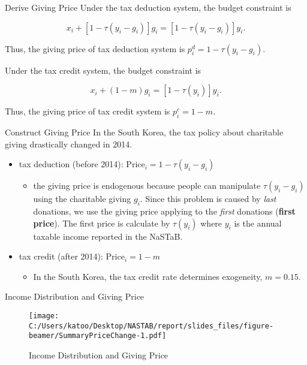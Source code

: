 \documentclass[
  ignorenonframetext,
]{beamer}
\providecommand{\tightlist}{%
  \setlength{\itemsep}{0pt}\setlength{\parskip}{0pt}}
\begin{document}
\begin{frame}{Derive Giving Price}
\protect\hypertarget{derive-giving-price}{}
Under the tax deduction system, the budget constraint is

\[
    x_i + [1 - \tau(y_i - g_i)]g_i = [1 - \tau(y_i - g_i)] y_i.
\]

Thus, the giving price of tax deduction system is
\(p_i^{d} = 1 - \tau(y_i - g_i)\).

Under the tax credit system, the budget constraint is

\[
    x_i + (1 - m) g_i = [1 - \tau(y_i)] y_i.
\]

Thus, the giving price of tax credit system is \(p_i^c = 1 - m\).
\end{frame}

\begin{frame}{Construct Giving Price}
\protect\hypertarget{construct-giving-price}{}
In the South Korea, the tax policy about charitable giving drastically
changed in 2014.

\begin{itemize}
\tightlist
\item
  tax deduction (before 2014): \(\text{Price}_i = 1 - \tau(y_i - g_i)\)

  \begin{itemize}
  \tightlist
  \item
    the giving price is endogenous because people can manipulate
    \(\tau(y_i - g_i)\) using the charitable giving \(g_i\). Since this
    problem is caused by \emph{last} donations, we use the giving price
    applying to the \emph{first} donations (\textbf{first price}). The
    first price is calculate by \(\tau(y_i)\) where \(y_i\) is the
    annual taxable income reported in the NaSTaB.
  \end{itemize}
\item
  tax credit (after 2014): \(\text{Price}_i = 1 - m\)

  \begin{itemize}
  \tightlist
  \item
    In the South Korea, the tax credit rate determines exogeneity,
    \(m = 0.15\).
  \end{itemize}
\end{itemize}
\end{frame}

\begin{frame}{Income Distribution and Giving Price}
\protect\hypertarget{income-distribution-and-giving-price}{}
\begin{figure}
\centering
\texttt{[image: C:/Users/katoo/Desktop/NASTAB/report/slides\_files/figure-beamer/SummaryPriceChange-1.pdf]}
\caption{Income Distribution and Giving Price}
\end{figure}
\end{frame}
\end{document}
